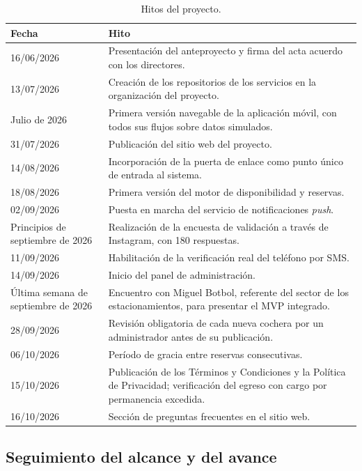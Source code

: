 \begin{table}[H]
\centering
\renewcommand{\arraystretch}{1.3}
\small
\begin{tabularx}{\textwidth}{l >{\raggedright\arraybackslash}X}
\toprule
\textbf{Fecha} & \textbf{Hito} \\
\midrule
16/06/2026 & Presentación del anteproyecto y firma del acta acuerdo con los directores. \\
13/07/2026 & Creación de los repositorios de los servicios en la organización del proyecto. \\
Julio de 2026 & Primera versión navegable de la aplicación móvil, con todos sus flujos sobre datos simulados. \\
31/07/2026 & Publicación del sitio web del proyecto. \\
14/08/2026 & Incorporación de la puerta de enlace como punto único de entrada al sistema. \\
18/08/2026 & Primera versión del motor de disponibilidad y reservas. \\
02/09/2026 & Puesta en marcha del servicio de notificaciones \textit{push}. \\
Principios de septiembre de 2026 & Realización de la encuesta de validación a través de Instagram, con 180 respuestas. \\
11/09/2026 & Habilitación de la verificación real del teléfono por SMS. \\
14/09/2026 & Inicio del panel de administración. \\
Última semana de septiembre de 2026 & Encuentro con Miguel Botbol, referente del sector de los estacionamientos, para presentar el MVP integrado. \\
28/09/2026 & Revisión obligatoria de cada nueva cochera por un administrador antes de su publicación. \\
06/10/2026 & Período de gracia entre reservas consecutivas. \\
15/10/2026 & Publicación de los Términos y Condiciones y la Política de Privacidad; verificación del egreso con cargo por permanencia excedida. \\
16/10/2026 & Sección de preguntas frecuentes en el sitio web. \\
\bottomrule
\end{tabularx}
\caption{Hitos del proyecto.}
\label{tab:hitos}
\end{table}

\subsection{Seguimiento del alcance y del avance}

